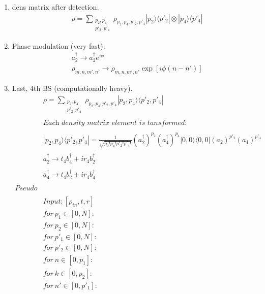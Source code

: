 \documentclass[12pt]{article}
\begin{document}
\begin{enumerate}
\item dens matrix after detection.
\begin{align*}
& \rho = \sum_{\substack{p_{2},p_{4} \\ p'_{2}, p'_{4}}}  \rho_{p_{2},p_{4}, p'_{2}, p'_{4}} |p_{2}\rangle \langle p'_{2}| \otimes |p_{4}\rangle \langle p'_{4}|
\end{align*}

\item Phase modulation (very fast):
\begin{align*} 
&  a_{2}^{\dag} \rightarrow   a_{2}^{\dag} e^{i\phi} \\
& \rho_{m,n,m',n'} \rightarrow \rho_{m,n,m',n'} \exp[i \phi (n - n')]
\end{align*}

\item Last, 4th BS (computationally heavy).
\begin{align*}
& \rho = \sum_{\substack{p_{2},p_{4} \\ p'_{2}, p'_{4}}}  \rho_{p_{2},p_{4}, p'_{2}, p'_{4}} |p_{2},p_{4}\rangle \langle p'_{2},p'_{4}| \\
\\
& \textit{Each density matrix element is tansformed:} \\
\\
& |p_{2},p_{4}\rangle \langle p'_{2},p'_{4}| = \frac{1}{\sqrt{p_{2}!p_{4}!p'_{2}!p'_{4}!}} (a_{2}^{\dag})^{p_{2}} (a_{4}^{\dag})^{p_{4}} |0,0\rangle \langle 0,0| (a_{2})^{p'_{2}} (a_{4})^{p'_{4}} \\ 
\\
&  a_{2}^{\dag} \rightarrow  t_{4}b_{4}^{\dag} + ir_{4}b_{2}^{\dag} \\
\\
&  a_{4}^{\dag} \rightarrow  t_{4}b_{2}^{\dag} + ir_{4}b_{4}^{\dag} \\
\\
\textit{Pseudo code:} \\
\\
& Input: [\rho_{in}, t, r] \\
&   for  \ p_{1} \in [0, N]: \\
&   for \ p_{2} \in [0, N]: \\
&   for  \ p'_{1} \in [0, N]: \\
&   for \ p'_{2} \in [0, N]: \\
&   for \ n \in [0,p_{1}]: \\
&   for \ k \in [0,p_{2}]: \\
&   for  \ n' \in [0, p'_{1}]: \\

\end{align*}
\end{enumerate}
\end{document}
